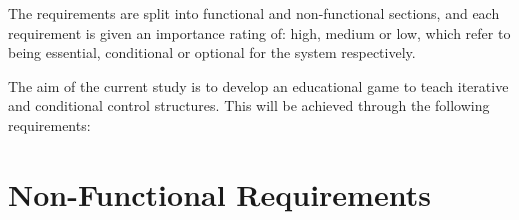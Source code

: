 \documentclass[a4paper,11.5pt]{report}
\numberwithin{figure}{section}
\numberwithin{table}{section}
\numberwithin{equation}{section}
\numberwithin{equation}{section}
\begin{document}
The requirements are split into functional and non-functional sections, and each requirement is given an importance rating of: high, medium or low, which refer to being essential, conditional or optional for the system respectively. 

The aim of the current study is to develop an educational game to teach iterative and conditional control structures. This will be achieved through the following requirements:







\section{Non-Functional Requirements}
\end{document}
